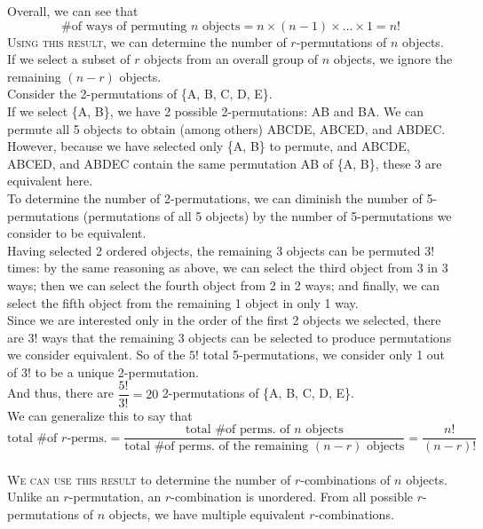 \documentclass{article}
\begin{document}
Overall, we can see that
\begin{equation*}
\text{\# of ways of permuting }n\text{ objects}=n\times(n-1)\times\ldots\times 1=n!
\end{equation*}
\textsc{Using this result,} we can determine the number of $r$-permutations of $n$ objects.\\[1ex]
If we select a subset of $r$ objects from an overall group of $n$ objects, we ignore the remaining $(n-r)$ objects.\\[1em]
Consider the 2-permutations of \{A, B, C, D, E\}.\\[1ex]
If we select \{A, B\}, we have 2 possible 2-permutations: AB and BA. We can permute all 5 objects to obtain (among others) ABCDE, ABCED, and ABDEC. However, because we have selected only \{A, B\} to permute, and ABCDE, ABCED, and ABDEC contain the same permutation AB of \{A, B\}, these 3 are equivalent here.\\[1ex]
To determine the number of 2-permutations, we can diminish the number of 5-permutations (permutations of all 5 objects) by the number of 5-permutations we consider to be equivalent.\\[1ex]
Having selected 2 ordered objects, the remaining 3 objects can be permuted $3!$ times: by the same reasoning as above, we can select the third object from 3 in 3 ways; then we can select the fourth object from 2 in 2 ways; and finally, we can select the fifth object from the remaining 1 object in only 1 way.\\
Since we are interested only in the order of the first 2 objects we selected, there are $3!$ ways that the remaining 3 objects can be selected to produce permutations we consider equivalent. So of the $5!$ total 5-permutations, we consider only 1 out of $3!$ to be a unique 2-permutation.\\
And thus, there are $\dfrac{5!}{3!}=20$ 2-permutations of \{A, B, C, D, E\}.\\[1em]
We can generalize this to say that
\begin{equation*}
\text{total \# of }r\text{-perms.}=\dfrac{\text{total \# of perms. of }n\text{ objects}}{\text{total \# of perms. of the remaining }(n-r)\text{ objects}}=\dfrac{n!}{(n-r)!}
\end{equation*}\\[1em]
\textsc{We can use this result} to determine the number of $r$-combinations of $n$ objects.\\[1ex]
Unlike an $r$-permutation, an $r$-combination is unordered. From all possible $r$-permutations of $n$ objects, we have multiple equivalent $r$-combinations.\\[1em]
\end{document}
